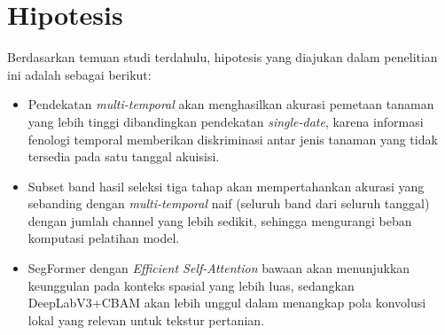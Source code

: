 \section{Hipotesis}
Berdasarkan temuan studi terdahulu, hipotesis yang diajukan dalam penelitian ini adalah sebagai berikut:
\begin{itemize}
    \item Pendekatan \textit{multi-temporal} akan menghasilkan akurasi pemetaan tanaman yang lebih tinggi dibandingkan pendekatan \textit{single-date}, karena informasi fenologi temporal memberikan diskriminasi antar jenis tanaman yang tidak tersedia pada satu tanggal akuisisi.
    \item Subset band hasil seleksi tiga tahap akan mempertahankan akurasi yang sebanding dengan \textit{multi-temporal} naif (seluruh band dari seluruh tanggal) dengan jumlah channel yang lebih sedikit, sehingga mengurangi beban komputasi pelatihan model.
    \item SegFormer dengan \textit{Efficient Self-Attention} bawaan akan menunjukkan keunggulan pada konteks spasial yang lebih luas, sedangkan DeepLabV3+CBAM akan lebih unggul dalam menangkap pola konvolusi lokal yang relevan untuk tekstur pertanian.
\end{itemize}

